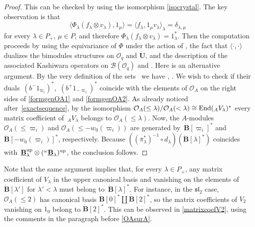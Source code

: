 \documentclass[pdftex]{sigma}
\numberwithin{equation}{section}
\theoremstyle{definition}
\newcommand{\Oq}{\Oo_{q}}
\newcommand{\Oo}{{\mathcal O}}
\begin{document}
\begin{proof} This can be checked by using the isomorphism \eqref{isocrystal}. The key observation is that
 \[\langle \Phi_\lambda(f_\lambda \otimes v_\lambda), 1_\mu\rangle = \langle f_\lambda , 1_\mu v_\lambda \rangle_\lambda = \delta_{\lambda,\mu}\]
 for every $\lambda\in P_+$, $\mu\in P$, and therefore $\Phi_\lambda(f_\lambda \otimes v_\lambda) = 1_\lambda^*$. Then the computation proceeds by using the equivariance of $\Phi$ under the action of , the fact that $\langle\cdot,\cdot \rangle$ dualizes the bimodules structures on $\Oq$ and $\dot{\mathbf{U}}$, and the description of the associated Kashiwara operators on $\mathcal{B}(\Oo_q)$ and . Here is an alternative argument. By the very definition of the sets~ we have , . We wish to check if their duals~$(b^-1_{\varpi_i})^*$,~$(b^+1_{-\varpi_i})^*$ coincide with the elements of $\Oo_A$ on the right sides of \eqref{formgenOA1} and \eqref{formgenOA2}. As already noticed after~\eqref{exactsequence}, by the isomorphism $\Oo_A(\leq \lambda)/\Oo_A(<\lambda) \cong {\rm End}({}_AV_\lambda)^*$ every matrix coefficient of~${}_AV_\lambda$ belongs to $\Oo_A(\leq \lambda)$. Now, the $A$-modules $\Oo_A(\leq \varpi_i)$ and $\Oo_A(\leq -w_0(\varpi_i))$ are generated by~${\dot{\mathbf{B}}[\varpi_i]^*}$ and $\dot{\mathbf{B}} [-w_0(\varpi_i)]^*$, respectively. Because $((\bar{\pi}_{\lambda}^*)^{-1} \circ d_{\lambda})(\dot{\mathbf{B}} [\lambda]^*)$ coincides with~${\underline{\mathbf{B}}_{\lambda}^{\rm up} \otimes ({}^{\omega}\underline{\mathbf{B}}_{\lambda})^{\rm up}}$, the conclusion follows.
 \end{proof}

Note that the same argument implies that, for every $\lambda\in P_+$, any matrix coefficient of $V_\lambda$ in the upper canonical basis and vanishing on the elements of $\dot{\mathbf{B}} [\lambda']$ for $\lambda'<\lambda$ must belong to~$\dot{\mathbf{B}} [\lambda]^*$. For instance, in the ${\mathfrak{sl}_2}$ case, $\Oo_A(\leq 2)$ has canonical basis $\dot{\mathbf{B}} [0]^* \coprod \dot{\mathbf{B}} [2]^*$, so the matrix coefficients of $V_2$ vanishing on $1_0$ belong to $\dot{\mathbf{B}} [2]^*$. This can be observed in \eqref{matrixcoefV2}, using the comments in the paragraph before \eqref{OAsurA}.
\end{document}
